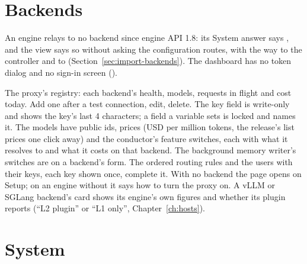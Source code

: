 

\section{Backends}

An engine relays to no backend since engine API 1.8: its System answer says , and the view says so without asking the configuration routes, with the way to the controller and to  (Section~\ref{sec:import-backends}). The dashboard has no token dialog and no sign-in screen ().


The proxy's registry: each backend's health, models, requests in flight and cost today. Add one after a test connection, edit, delete. The key field is write-only and shows the key's last 4 characters; a field a  variable sets is locked and names it. The models have public ids, prices (USD per million tokens, the release's list prices one click away) and the conductor's feature switches, each with what it resolves to and what it costs on that backend. The background memory writer's switches are on a backend's form. The ordered routing rules and the users with their keys, each key shown once, complete it. With no backend the page opens on Setup; on an engine without  it says how to turn the proxy on. A vLLM or SGLang backend's card shows its engine's own figures and whether its plugin reports (\enquote{L2 plugin} or \enquote{L1 only}, Chapter~\ref{ch:hosts}).

\section{System}

